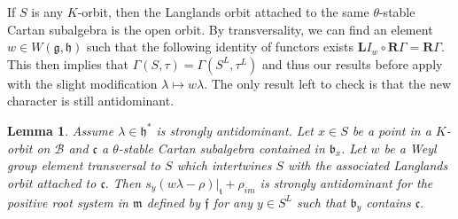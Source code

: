 \documentclass[letterpaper,twosided,11pt]{article}
\theoremstyle{plain}
\newtheorem{lemma}[theorem]{Lemma}
\theoremstyle{definition}
\theoremstyle{remark}
\newcommand{\comp}{\circ}
\newcommand{\lie}[1]{\mathfrak{#1}}
\begin{document}
If $ S $ is any $ K $-orbit, then the Langlands orbit attached to
the same $ \theta $-stable Cartan subalgebra is the open orbit.  By transversality, we can
find an element $ w\in W(\lie{g},\lie{h}) $ such that the following
identity of functors exists $ \textbf{L}I_w\comp \textbf{R}\Gamma=\textbf
{R}\Gamma. $ This then implies that $ \Gamma(S,\tau)=\Gamma(S^L,\tau^L) $
and thus our results before apply with the slight modification $ \lambda\mapsto
w\lambda. $ The only result left to check is that the new character is still antidominant.  
\begin{lemma}
    \label{Antidominant_translation} Assume $ \lambda\in \lie{h}^* $ is
    strongly antidominant.  Let $ x\in S $ be a point in a $ K $-orbit
    on $ \mathcal{B} $ and $ \lie{c} $ a $ \theta $-stable Cartan
    subalgebra contained in $ \lie{b}_x. $ Let $ w $ be a Weyl group
    element transversal to $ S $ which intertwines $ S $ with the
    associated Langlands orbit attached to $ \lie{c}. $ Then $ s_y(w\lambda-\rho)|_\lie
    {t}+\rho_{im} $ is strongly antidominant for the positive root
    system in $ \lie{m} $ defined by $ \lie{f} $ for any $ y\in S^L $
    such that $ \lie{b}_y $ contains $ \lie{c}. $
\end{lemma}
\end{document}
